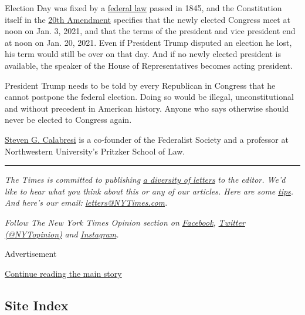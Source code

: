 Election Day was fixed by a
\href{https://www.loc.gov/law/help/statutes-at-large/28th-congress/session-2/c28s2ch1.pdf}{federal
law} passed in 1845, and the Constitution itself in the
\href{https://constitutioncenter.org/interactive-constitution/amendment/amendment-xx}{20th
Amendment} specifies that the newly elected Congress meet at noon on
Jan. 3, 2021, and that the terms of the president and vice president end
at noon on Jan. 20, 2021. Even if President Trump disputed an election
he lost, his term would still be over on that day. And if no newly
elected president is available, the speaker of the House of
Representatives becomes acting president.

President Trump needs to be told by every Republican in Congress that he
cannot postpone the federal election. Doing so would be illegal,
unconstitutional and without precedent in American history. Anyone who
says otherwise should never be elected to Congress again.

\href{https://www.law.northwestern.edu/faculty/profiles/StevenCalabresi/}{Steven
G. Calabresi} is a co-founder of the Federalist Society and a professor
at Northwestern University's Pritzker School of Law.

\begin{center}\rule{0.5\linewidth}{\linethickness}\end{center}

\emph{The Times is committed to publishing}
\href{https://www.nytimes3xbfgragh.onion/2019/01/31/opinion/letters/letters-to-editor-new-york-times-women.html}{\emph{a
diversity of letters}} \emph{to the editor. We'd like to hear what you
think about this or any of our articles. Here are some}
\href{https://help.nytimes3xbfgragh.onion/hc/en-us/articles/115014925288-How-to-submit-a-letter-to-the-editor}{\emph{tips}}\emph{.
And here's our email:}
\href{mailto:letters@NYTimes.com}{\emph{letters@NYTimes.com}}\emph{.}

\emph{Follow The New York Times Opinion section on}
\href{https://www.facebookcorewwwi.onion/nytopinion}{\emph{Facebook}}\emph{,}
\href{http://twitter.com/NYTOpinion}{\emph{Twitter (@NYTopinion)}}
\emph{and}
\href{https://www.instagram.com/nytopinion/}{\emph{Instagram}}\emph{.}

Advertisement

\protect\hyperlink{after-bottom}{Continue reading the main story}

\hypertarget{site-index}{%
\subsection{Site Index}\label{site-index}}

